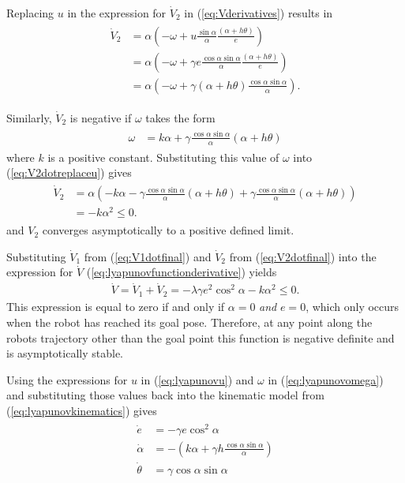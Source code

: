 Replacing $u$ in the expression for $\dot{V}_2$ in (\ref{eq:Vderivatives}) results in
\begin{align}
\label{eq:V2dotreplaceu}
\begin{split}
\dot{V}_2 &= \alpha\left(-\omega+u\frac{\sin\alpha}{\alpha}\frac{(\alpha+h\theta)}{e}\right) \\
&= \alpha\left(-\omega+\gamma e\frac{\cos\alpha\sin\alpha}{\alpha}\frac{(\alpha+h\theta)}{e}\right) \\
&= \alpha\left(-\omega+\gamma(\alpha+h\theta)\frac{\cos\alpha\sin\alpha}{\alpha}\right).
\end{split}
\end{align}

Similarly, $\dot{V}_2$ is negative if $\omega$ takes the form
\begin{align}
\label{eq:lyapunovomega}
\begin{split}
\omega &= k\alpha + \gamma\frac{\cos\alpha\sin\alpha}{\alpha}\left(\alpha+h\theta\right)
\end{split}
\end{align}
where $k$ is a positive constant. Substituting this value of $\omega$ into (\ref{eq:V2dotreplaceu}) gives
\begin{align}
\label{eq:V2dotfinal}
\begin{split}
\dot{V}_2 &= \alpha\left(-k\alpha-\gamma\frac{\cos\alpha\sin\alpha}{\alpha}(\alpha+h\theta) + \gamma\frac{\cos\alpha\sin\alpha}{\alpha}(\alpha+h\theta)\right) \\
&= -k\alpha^2 \leq 0.
\end{split}
\end{align}
and $V_2$ converges asymptotically to a positive defined limit.

Substituting $\dot{V}_1$ from (\ref{eq:V1dotfinal}) and $\dot{V}_2$ from (\ref{eq:V2dotfinal}) into the expression for $\dot{V}$ (\ref{eq:lyapunovfunctionderivative}) yields
\begin{align*}
\dot{V} = \dot{V}_1 + \dot{V}_2 = -\lambda\gamma e^2\cos^2\alpha - k\alpha^2 \leq 0.
\end{align*}
This expression is equal to zero if and only if $\alpha=0$ \textit{and} $e=0$, which only occurs when the robot has reached its goal pose. Therefore, at any point along the robots trajectory other than the goal point this function is negative definite and is asymptotically stable.

Using the expressions for $u$ in (\ref{eq:lyapunovu}) and $\omega$ in (\ref{eq:lyapunovomega}) and substituting those values back into the kinematic model from (\ref{eq:lyapunovkinematics}) gives
\begin{align*}
\begin{split}
\dot{e} &= -\gamma e\cos^2\alpha \\
\dot{\alpha} &= -\left(k\alpha + \gamma h\frac{\cos\alpha\sin\alpha}{\alpha}\right) \\
\dot{\theta} &= \gamma\cos\alpha\sin\alpha
\end{split}
\end{align*}

